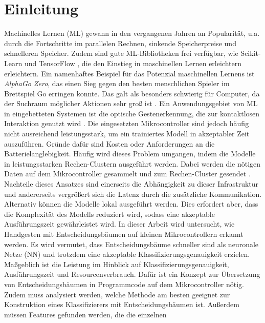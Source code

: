\chapter{Einleitung}
Machinelles Lernen (ML) gewann in den vergangenen Jahren an Popularität, u.a. durch die Fortschritte im parallelen Rechnen,
sinkende Speicherpreise und schnelleren Speicher. Zudem sind gute ML-Bibliotheken frei verfügbar, wie Scikit-Learn \cite{scikit-learn} und TensorFlow \cite{abadi2016tensorflow}, die
den Einstieg in maschinellen Lernen erleichtern erleichtern. Ein namenhaftes Beispiel für das Potenzial maschinellen Lernens ist \textit{AlphaGo Zero},
das einen Sieg gegen den besten menschlichen Spieler im Brettspiel Go erringen konnte. Das galt als besonders schwierig für Computer,
da der Suchraum möglicher Aktionen sehr groß ist \cite{silver2017mastering}.
\newline
\newline
Ein Anwendungsgebiet von ML in eingebetteten Systemen ist die optische Gestenerkennung, die zur kontaktlosen Interaktion genutzt wird \cite{pavlovic1997visual}.
Die eingesetzten Mikrocontroller sind jedoch häufig nicht ausreichend leistungsstark, um ein trainiertes Modell in akzeptabler Zeit auszuführen. Gründe dafür sind
Kosten oder Anforderungen an die Batterielanglebigkeit. Häufig wird dieses Problem umgangen, indem die Modelle in leistungsstarken Rechen-Clustern ausgeführt werden.
Dabei werden die nötigen Daten auf dem Mikrocontroller gesammelt und zum Rechen-Cluster gesendet \cite{venzkeArticle}. Nachteile dieses Ansatzes sind einerseits die Abhängigkeit zu dieser
Infrastruktur und andererseits vergrößert sich die Latenz durch die zusätzliche Kommunikation. Alternativ können die Modelle lokal ausgeführt werden. Dies erfordert aber, dass die
Komplexität des Modells reduziert wird, sodass eine akzeptable Ausführungszeit gewährleistet wird.
\newline
\newline
In dieser Arbeit wird untersucht, wie Handgesten mit Entscheidungsbäumen auf kleinen Mikrocontrollern erkannt werden. Es wird vermutet, dass Entscheidungsbäume schneller sind als neuronale Netze (NN) und
trotzdem eine akzeptable Klassifizierungsgenauigkeit erzielen. Maßgeblich ist die Leistung im Hinblick auf Klassifizierungsgenauigkeit, Ausführungszeit und Resourcenverbrauch.
Dafür ist ein Konzept zur Übersetzung von Entscheidungsbäumen in Programmcode auf dem Mikrocontroller nötig.
Zudem muss analysiert werden, welche Methode am besten geeignet zur Konstruktion eines Klassifizierers mit Entscheidungsbäumen ist. Außerdem müssen Features gefunden werden, die die einzelnen
